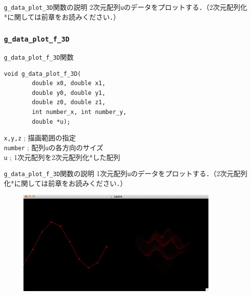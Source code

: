 \documentclass[platex,a4paper,12pt]{jsarticle}%
\begin{document}
\begin{itembox}[l]{\texttt{g\_data\_plot\_3D}関数の説明}
2次元配列\verb|u|のデータをプロットする．（2次元配列化*に関しては前章をお読みください．）
\end{itembox}

\begin{figure}[htb]
\end{figure}




\clearpage
\subsubsection{\texttt{g\_data\_plot\_f\_3D}}

\begin{itembox}[l]{\texttt{g\_data\_plot\_f\_3D}関数}
\begin{verbatim}
void g_data_plot_f_3D(
        double x0, double x1,
        double y0, double y1,
        double z0, double z1,
        int number_x, int number_y,
        double *u);
\end{verbatim}
\verb|x,y,z| ; 描画範囲の指定\\
\verb|number| ; 配列\verb|u|の各方向のサイズ\\
\verb|u| ; 1次元配列を2次元配列化*した配列
\end{itembox}

\begin{itembox}[l]{\texttt{g\_data\_plot\_f\_3D}関数の説明}
1次元配列\verb|u|のデータをプロットする．（2次元配列化*に関しては前章をお読みください．）
\end{itembox}

\begin{figure}[htb]
\centering
	\includegraphics[width=100mm]{Canvas_g_data_plot.eps}
\end{figure}
\end{document}

